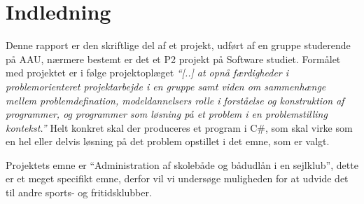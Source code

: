\chapter{Indledning}\label{chap:indledning}



Denne rapport er den skriftlige del af et projekt, udført af en gruppe studerende på AAU, nærmere bestemt er det et P2 projekt på Software studiet. Formålet med projektet er i følge projektoplæget \textit{``[..] at opnå færdigheder i problemorienteret projektarbejde i en gruppe samt viden om sammenhænge mellem problemdefination, modeldannelsers rolle i forståelse og konstruktion af programmer, og programmer som løsning på et problem i en problemstilling kontekst.''} Helt konkret skal der produceres et program i C\#, som skal virke som en hel eller delvis løsning på det problem opstillet i det emne, som er valgt. 

Projektets emne er ``Administration af skolebåde og bådudlån i en sejlklub'', dette er et meget specifikt emne, derfor vil vi undersøge muligheden for at udvide det til andre sports- og fritidsklubber. 

